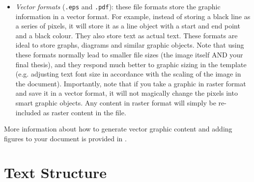 \documentclass[11pt,twoside,openright]{report}
\begin{document}
\begin{itemize}[noitemsep]
\begin{itemize}[noitemsep]
        \item \emph{Vector formats} (\verb|.eps| and \verb|.pdf|): these file formats store the graphic information in a vector format. For example, instead of storing a black line as a series of pixels, it will store it as a line object with a start and end point and a black colour. They also store text as actual text. These formats are ideal to store graphs, diagrams and similar graphic objects. Note that using these formats normally lead to smaller file sizes (the image itself AND your final thesis), and they respond much better to graphic sizing in the template (e.g. adjusting text font size in accordance with the scaling of the image in the document). Importantly, note that if you take a graphic in raster format and save it in a vector format, it will not magically change the pixels into smart graphic objects. Any content in raster format will simply be re-included as raster content in the file. 
      \end{itemize}
      More information about how to generate vector graphic content and adding figures to your document is provided in .
  
\end{itemize}



\section{Text Structure}
\label{sec:TextStructure}
\end{document}
